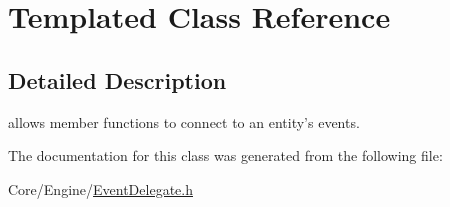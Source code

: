 \hypertarget{classTemplated}{\section{Templated Class Reference}
\label{classTemplated}
}


\subsection{Detailed Description}
allows member functions to connect to an entity's events. 

The documentation for this class was generated from the following file\-:\begin{DoxyCompactItemize}
\item 
Core/\-Engine/\hyperlink{EventDelegate_8h}{Event\-Delegate.\-h}\end{DoxyCompactItemize}
